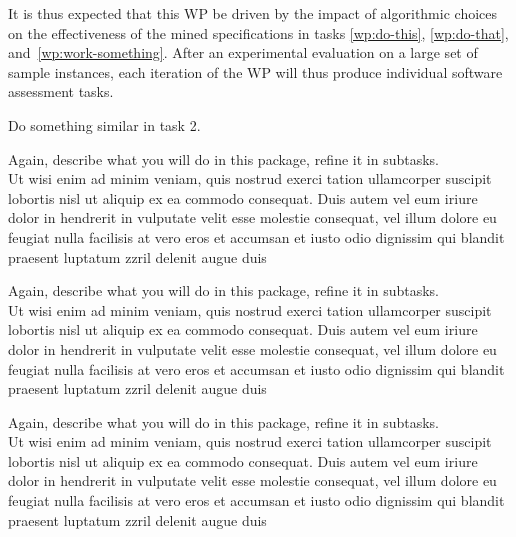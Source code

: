 \noindent It is thus expected that this WP be driven by the impact of algorithmic choices on the effectiveness of the mined specifications in tasks \ref{wp:do-this}, \ref{wp:do-that}, and~\ref{wp:work-something}.  After an experimental evaluation on a large set of sample instances, each iteration of the WP will thus produce individual software assessment tasks.

\label{task-wp1-2}

Do something similar in task 2.

\label{wp:work-something}
Again, describe what you will do in this package, refine it in subtasks.\\
Ut wisi enim ad minim veniam, quis nostrud exerci tation ullamcorper suscipit lobortis nisl ut aliquip ex ea commodo consequat. Duis autem vel eum iriure dolor in hendrerit in vulputate velit esse molestie consequat, vel illum dolore eu feugiat nulla facilisis at vero eros et accumsan et iusto odio dignissim qui blandit praesent luptatum zzril delenit augue duis

\label{wp:do-this}
Again, describe what you will do in this package, refine it in subtasks.\\
Ut wisi enim ad minim veniam, quis nostrud exerci tation ullamcorper suscipit lobortis nisl ut aliquip ex ea commodo consequat. Duis autem vel eum iriure dolor in hendrerit in vulputate velit esse molestie consequat, vel illum dolore eu feugiat nulla facilisis at vero eros et accumsan et iusto odio dignissim qui blandit praesent luptatum zzril delenit augue duis


\label{wp:do-that}
Again, describe what you will do in this package, refine it in subtasks.\\
Ut wisi enim ad minim veniam, quis nostrud exerci tation ullamcorper suscipit lobortis nisl ut aliquip ex ea commodo consequat. Duis autem vel eum iriure dolor in hendrerit in vulputate velit esse molestie consequat, vel illum dolore eu feugiat nulla facilisis at vero eros et accumsan et iusto odio dignissim qui blandit praesent luptatum zzril delenit augue duis


